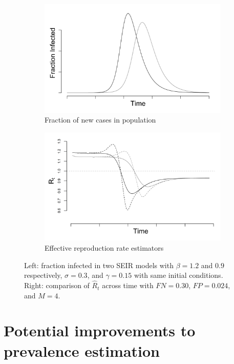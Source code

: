 \documentclass[11pt]{amsart}
\numberwithin{equation}{section}
\theoremstyle{plain}
\begin{document}
 \begin{figure}
 \centering
 \begin{subfigure}{.5\textwidth}
  \centering
  \includegraphics[width=.9\linewidth]{../figs/seir.png}
  \caption{Fraction of new cases in population}
  \label{fig:fracpop}
 \end{subfigure}%
 \begin{subfigure}{.5\textwidth}
  \centering
  \includegraphics[width=.9\linewidth]{../figs/seir_rt_comparison.png}
  \caption{Effective reproduction rate estimators}
  \label{fig:eff}
 \end{subfigure}
 \caption{Left: fraction infected in two SEIR models with $\beta = 1.2$ and $0.9$ respectively, $\sigma = 0.3$, and $\gamma = 0.15$ with same initial conditions. Right: comparison of $\hat R_t$ across time with $FN = 0.30$, $FP = 0.024$, and $M = 4$.}
 \label{fig:comparison}
 \end{figure}

 \section{Potential improvements to prevalence estimation}
 \label{section:improvedcasecount}
\end{document}
